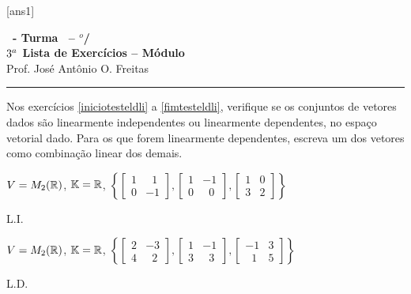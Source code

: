\documentclass[12pt]{exam}
\begin{document}
    [ans1]

    \begin{center}
        {\Large\bf \disciplina\ - Turma \turma\ -- \semestre$^{o}$/\ano} \\ \vspace{9pt} {\large\bf
            $3^a$ Lista de Exercícios -- Módulo \numeromodulo}\\ \vspace{9pt} Prof. José Antônio O. Freitas
    \end{center}

    \hrule

    Nos exercícios \ref{iniciotesteldli} a \ref{fimtesteldli}, verifique se os conjuntos de vetores dados são  linearmente independentes ou linearmente dependentes,  no espaço vetorial dado. Para os que forem linearmente dependentes, escreva um dos vetores como combinação linear dos demais.

    \begin{exercicio}\label{iniciotesteldli}
        $V = M_2(\mathbb{R})$, $\mathbb{K} = \mathbb{R}$,
        $
            \left\{
                \begin{bmatrix}
                    1 & \phantom{x} 1\\
                    0 & -1
                \end{bmatrix},
                \begin{bmatrix}
                    1 & -1\\
                    0 & \phantom{x} 0
                \end{bmatrix},
                \begin{bmatrix}
                    1 & 0\\
                    3 & 2
                \end{bmatrix}
            \right\}
        $
        \begin{solucao}
            L.I.
        \end{solucao}
    \end{exercicio}

    \begin{exercicio}
        $V = M_2(\mathbb{R})$, $\mathbb{K} = \mathbb{R}$,
        $
            \left\{
                \begin{bmatrix}
                    2 & -3\\
                    4 & \phantom{x} 2
                \end{bmatrix},
                \begin{bmatrix}
                    1 & -1\\
                    3 & \phantom{x} 3
                \end{bmatrix},
                \begin{bmatrix}
                    -1 & 3\\
                    \phantom{x} 1 & 5
                \end{bmatrix}
            \right\}
        $
        \begin{solucao}
            L.D.
        \end{solucao}
    \end{exercicio}
\end{document}
